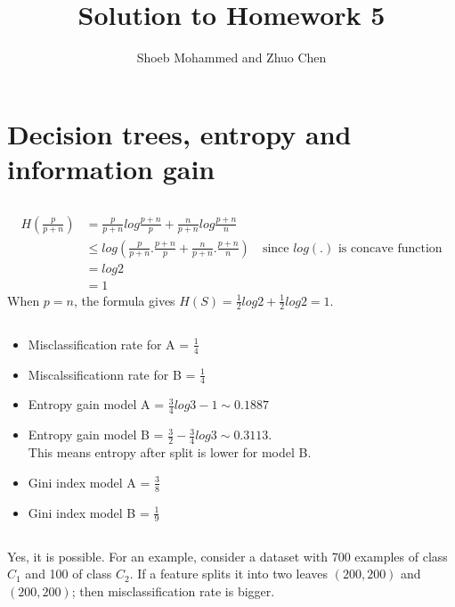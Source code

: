 \documentclass{article}
\begin{document}
\title{Solution to Homework 5}
\author{Shoeb Mohammed and Zhuo Chen}
\maketitle

\newcommand{\QEDA}{\hfill\ensuremath{\blacksquare}}
\newcommand{\QEDB}{\hfill\ensuremath{\square}}

\section{Decision trees, entropy and information gain}

\subsection{}
\begin{equation}
  \label{eq:1.1}
  \begin{split}
  H\left(\frac{p}{p+n}\right) &= \frac{p}{p+n}log\frac{p+n}{p} + \frac{n}{p+n}log\frac{p+n}{n}\\
               &\leq log\left(\frac{p}{p+n}.\frac{p+n}{p} + \frac{n}{p+n}.\frac{p+n}{n}\right) \quad \text{since $log(.)$ is concave function} \\
			   &= log2 \\
			   &= 1
  \end{split}
\end{equation}
When $p=n$, the formula gives $H(S) = \frac{1}{2}log2 + \frac{1}{2}log2 = 1$.


\subsection{}
\begin{itemize}
	\item Misclassification rate for A = $\frac{1}{4}$
	\item Miscalssificationn rate for B = $\frac{1}{4}$
	\item Entropy gain model A = $\frac{3}{4}log3 - 1 \sim 0.1887$
	\item Entropy gain model B = $\frac{3}{2} - \frac{3}{4}log3 \sim 0.3113$. \\
	      This means entropy after split is lower for model B.
	\item Gini index model A = $\frac{3}{8}$
	\item Gini index model B = $\frac{1}{9}$
\end{itemize}

\subsection{}
Yes, it is possible. For an example, consider a dataset with 700 examples of class $C_1$ and 100 of class $C_2$.
If a feature splits it into two leaves $(200,200)$ and $(200,200)$; then misclassification rate is bigger.
\end{document}
